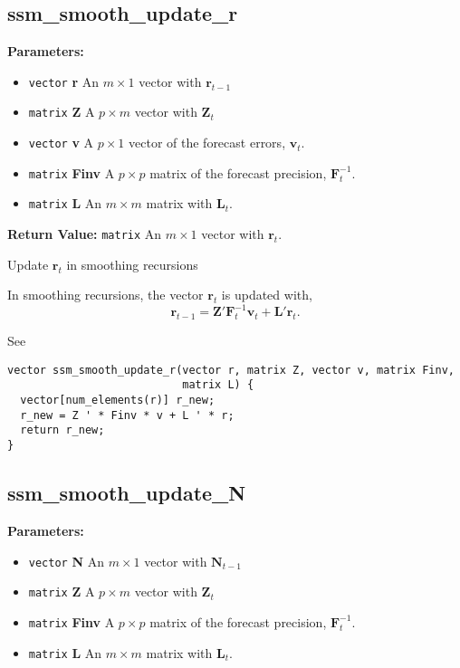 \documentclass[]{book}
\providecommand{\tightlist}{%
  \setlength{\itemsep}{0pt}\setlength{\parskip}{0pt}}
\newcommand{\mat}[1]{\boldsymbol{#1}}
\renewcommand{\vec}[1]{\boldsymbol{#1}}
\begin{document}
\subsection{ssm\_smooth\_update\_r}\label{ssmux5fsmoothux5fupdateux5fr}

\textbf{Parameters:}

\begin{itemize}
\tightlist
\item
  \texttt{vector} \textbf{r} An \(m \times 1\) vector with
  \(\vec{r}_{t-1}\)
\item
  \texttt{matrix} \textbf{Z} A \(p \times m\) vector with
  \(\mat{Z}_{t}\)
\item
  \texttt{vector} \textbf{v} A \(p \times 1\) vector of the forecast
  errors, \(\vec{v}_t\).
\item
  \texttt{matrix} \textbf{Finv} A \(p \times p\) matrix of the forecast
  precision, \(\mat{F}^{-1}_t\).
\item
  \texttt{matrix} \textbf{L} An \(m \times m\) matrix with
  \(\mat{L}_t\).
\end{itemize}

\textbf{Return Value:} \texttt{matrix} An \(m \times 1\) vector with
\(\vec{r}_t\).

Update \(\vec{r}_t\) in smoothing recursions

In smoothing recursions, the vector \(\vec{r}_t\) is updated with, \[
\vec{r}_{t - 1} = \mat{Z}' \mat{F}^{-1}_t \vec{v}_t + \mat{L}' \vec{r}_{t} .
\]

See \autocite[p.~91]{DurbinKoopman2012}

\begin{verbatim}
vector ssm_smooth_update_r(vector r, matrix Z, vector v, matrix Finv,
                           matrix L) {
  vector[num_elements(r)] r_new;
  r_new = Z ' * Finv * v + L ' * r;
  return r_new;
}
\end{verbatim}

\subsection{ssm\_smooth\_update\_N}\label{ssmux5fsmoothux5fupdateux5fn}

\textbf{Parameters:}

\begin{itemize}
\tightlist
\item
  \texttt{vector} \textbf{N} An \(m \times 1\) vector with
  \(\vec{N}_{t-1}\)
\item
  \texttt{matrix} \textbf{Z} A \(p \times m\) vector with
  \(\mat{Z}_{t}\)
\item
  \texttt{matrix} \textbf{Finv} A \(p \times p\) matrix of the forecast
  precision, \(\mat{F}^{-1}_t\).
\item
  \texttt{matrix} \textbf{L} An \(m \times m\) matrix with
  \(\mat{L}_t\).
\end{itemize}
\end{document}
